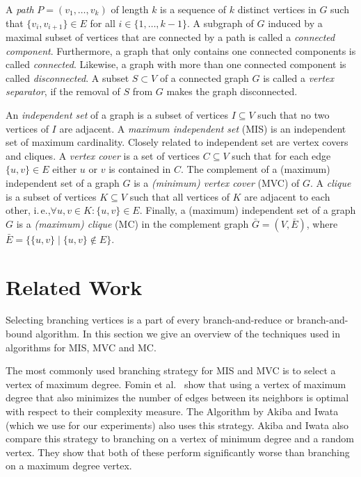 \documentclass[a4paper,UKenglish,cleveref, autoref, thm-restate]{lipics-v2021}
\newcommand{\ie}{i.\,e.,\xspace}
\begin{document}
A \emph{path} $P=(v_1, \ldots, v_k)$ of length $k$ is a sequence of $k$ distinct vertices in $G$ such that $\{v_i, v_{i+1}\} \in E$ for all $i \in \{1, \ldots, k-1\}$.
A subgraph of $G$ induced by a maximal subset of vertices that are connected by a path is called a \emph{connected component}.
Furthermore, a graph that only contains one connected components is called \emph{connected}.
Likewise, a graph with more than one connected component is called \emph{disconnected}.
A subset $S \subset V$ of a connected graph $G$ is called a \emph{vertex separator}, if the removal of $S$ from $G$ makes the graph disconnected.

An \emph{independent set} of a graph is a subset of vertices $I \subseteq V$ such that no two vertices of $I$ are adjacent. 
A \emph{maximum independent set} (MIS) is an independent set of maximum cardinality.
Closely related to independent set are vertex covers and cliques.
A \emph{vertex cover} is a set of vertices $C \subseteq V$ such that for each edge $\{u,v\} \in E$ either $u$ or $v$ is contained in $C$.
The complement of a (maximum) independent set of a graph $G$ is a \emph{(minimum) vertex cover} (MVC) of $G$.
A \emph{clique} is a subset of vertices $K \subseteq V$ such that all vertices of $K$ are adjacent to each other, \ie $\forall u,v \in K: \{u,v\} \in E$.
Finally, a (maximum) independent set of a graph $G$ is a \emph{(maximum) clique} (MC) in the complement graph $\bar{G} = (V, \bar{E})$, where $\bar{E} = \{\{u,v\} \mid \{u,v\} \not\in E\}$.

\section{Related Work}
Selecting branching vertices is a part of every branch-and-reduce or
branch-and-bound algorithm. In this section we give an overview of the techniques used in
algorithms for MIS, MVC and MC.

The most commonly used branching strategy for MIS and MVC is to select a vertex
of maximum degree. Fomin et al.~\cite{Fomin} show that using a vertex of maximum
degree that also minimizes the number of edges between its neighbors is optimal
with respect to their complexity measure. The Algorithm by Akiba and Iwata~\cite{AkibaIwata}
(which we use for our experiments) also uses this strategy. Akiba and Iwata also
compare this strategy to branching on a vertex of minimum degree and a random
vertex. They show that both of these perform significantly worse than branching
on a maximum degree vertex.
\end{document}
